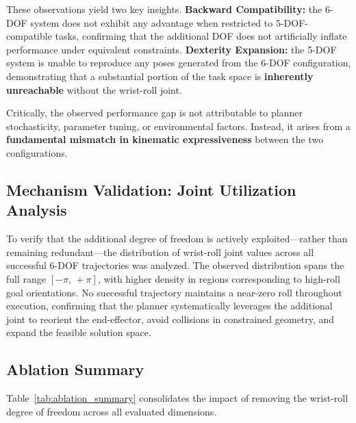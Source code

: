 \documentclass[conference]{IEEEtran}
\begin{document}
	These observations yield two key insights. \textbf{Backward
		Compatibility:} the 6-DOF system does not exhibit any advantage when
	restricted to 5-DOF-compatible tasks, confirming that the additional
	DOF does not artificially inflate performance under equivalent
	constraints. \textbf{Dexterity Expansion:} the 5-DOF system is unable
	to reproduce any poses generated from the 6-DOF configuration,
	demonstrating that a substantial portion of the task space is
	\textbf{inherently unreachable} without the wrist-roll joint.
	
	Critically, the observed performance gap is not attributable to
	planner stochasticity, parameter tuning, or environmental factors.
	Instead, it arises from a \textbf{fundamental mismatch in kinematic
		expressiveness} between the two configurations.
	
	\subsection{Mechanism Validation: Joint Utilization Analysis}
	
	To verify that the additional degree of freedom is actively
	exploited---rather than remaining redundant---the distribution of
	wrist-roll joint values across all successful 6-DOF trajectories was
	analyzed. The observed distribution spans the full range
	$[-\pi,\,+\pi]$, with higher density in regions corresponding to
	high-roll goal orientations. No successful trajectory maintains a
	near-zero roll throughout execution, confirming that the planner
	systematically leverages the additional joint to reorient the
	end-effector, avoid collisions in constrained geometry, and expand the
	feasible solution space.
	
	\subsection{Ablation Summary}
	
	Table~\ref{tab:ablation_summary} consolidates the impact of removing
	the wrist-roll degree of freedom across all evaluated dimensions.
	
\end{document}
